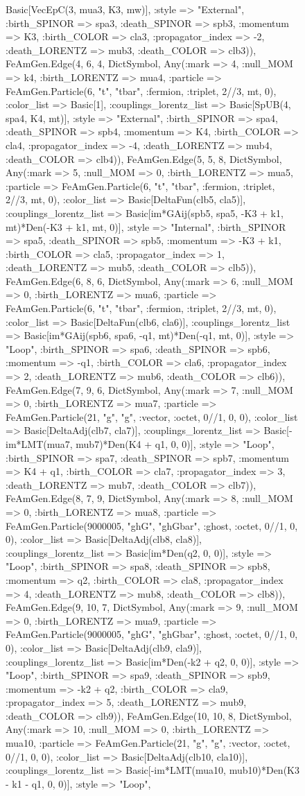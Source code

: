 \documentclass{revtex4}
\begin{document}
\begin{figure}[!htb]
\begin{center}
{Basic[VecEpC(3, mua3, K3, mw)], :style => "External", :birth_SPINOR => spa3, :death_SPINOR => spb3, :momentum => K3, :birth_COLOR => cla3, :propagator_index => -2, :death_LORENTZ => mub3, :death_COLOR => clb3)), FeAmGen.Edge(4, 6, 4, Dict{Symbol, Any}(:mark => 4, :null_MOM => k4, :birth_LORENTZ => mua4, :particle => FeAmGen.Particle(6, "t", "tbar", :fermion, :triplet, 2//3, mt, 0), :color_list => Basic[1], :couplings_lorentz_list => Basic[SpUB(4, spa4, K4, mt)], :style => "External", :birth_SPINOR => spa4, :death_SPINOR => spb4, :momentum => K4, :birth_COLOR => cla4, :propagator_index => -4, :death_LORENTZ => mub4, :death_COLOR => clb4)), FeAmGen.Edge(5, 5, 8, Dict{Symbol, Any}(:mark => 5, :null_MOM => 0, :birth_LORENTZ => mua5, :particle => FeAmGen.Particle(6, "t", "tbar", :fermion, :triplet, 2//3, mt, 0), :color_list => Basic[DeltaFun(clb5, cla5)], :couplings_lorentz_list => Basic[im*GAij(spb5, spa5, -K3 + k1, mt)*Den(-K3 + k1, mt, 0)], :style => "Internal", :birth_SPINOR => spa5, :death_SPINOR => spb5, :momentum => -K3 + k1, :birth_COLOR => cla5, :propagator_index => 1, :death_LORENTZ => mub5, :death_COLOR => clb5)), FeAmGen.Edge(6, 8, 6, Dict{Symbol, Any}(:mark => 6, :null_MOM => 0, :birth_LORENTZ => mua6, :particle => FeAmGen.Particle(6, "t", "tbar", :fermion, :triplet, 2//3, mt, 0), :color_list => Basic[DeltaFun(clb6, cla6)], :couplings_lorentz_list => Basic[im*GAij(spb6, spa6, -q1, mt)*Den(-q1, mt, 0)], :style => "Loop", :birth_SPINOR => spa6, :death_SPINOR => spb6, :momentum => -q1, :birth_COLOR => cla6, :propagator_index => 2, :death_LORENTZ => mub6, :death_COLOR => clb6)), FeAmGen.Edge(7, 9, 6, Dict{Symbol, Any}(:mark => 7, :null_MOM => 0, :birth_LORENTZ => mua7, :particle => FeAmGen.Particle(21, "g", "g", :vector, :octet, 0//1, 0, 0), :color_list => Basic[DeltaAdj(clb7, cla7)], :couplings_lorentz_list => Basic[-im*LMT(mua7, mub7)*Den(K4 + q1, 0, 0)], :style => "Loop", :birth_SPINOR => spa7, :death_SPINOR => spb7, :momentum => K4 + q1, :birth_COLOR => cla7, :propagator_index => 3, :death_LORENTZ => mub7, :death_COLOR => clb7)), FeAmGen.Edge(8, 7, 9, Dict{Symbol, Any}(:mark => 8, :null_MOM => 0, :birth_LORENTZ => mua8, :particle => FeAmGen.Particle(9000005, "ghG", "ghGbar", :ghost, :octet, 0//1, 0, 0), :color_list => Basic[DeltaAdj(clb8, cla8)], :couplings_lorentz_list => Basic[im*Den(q2, 0, 0)], :style => "Loop", :birth_SPINOR => spa8, :death_SPINOR => spb8, :momentum => q2, :birth_COLOR => cla8, :propagator_index => 4, :death_LORENTZ => mub8, :death_COLOR => clb8)), FeAmGen.Edge(9, 10, 7, Dict{Symbol, Any}(:mark => 9, :null_MOM => 0, :birth_LORENTZ => mua9, :particle => FeAmGen.Particle(9000005, "ghG", "ghGbar", :ghost, :octet, 0//1, 0, 0), :color_list => Basic[DeltaAdj(clb9, cla9)], :couplings_lorentz_list => Basic[im*Den(-k2 + q2, 0, 0)], :style => "Loop", :birth_SPINOR => spa9, :death_SPINOR => spb9, :momentum => -k2 + q2, :birth_COLOR => cla9, :propagator_index => 5, :death_LORENTZ => mub9, :death_COLOR => clb9)), FeAmGen.Edge(10, 10, 8, Dict{Symbol, Any}(:mark => 10, :null_MOM => 0, :birth_LORENTZ => mua10, :particle => FeAmGen.Particle(21, "g", "g", :vector, :octet, 0//1, 0, 0), :color_list => Basic[DeltaAdj(clb10, cla10)], :couplings_lorentz_list => Basic[-im*LMT(mua10, mub10)*Den(K3 - k1 - q1, 0, 0)], :style => "Loop", }
\end{center}
\end{figure}
\end{document}
